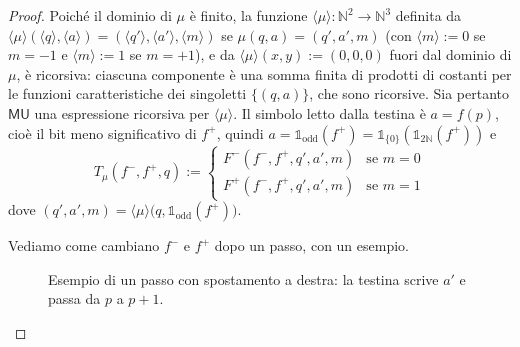 \begin{proof}
Poiché il dominio di $\mu$ è finito, la funzione $\langle\mu\rangle\colon\mathbb N^2\to\mathbb N^3$ definita da
$\langle\mu\rangle(\langle q\rangle,\langle a\rangle)=(\langle q'\rangle,\langle a'\rangle,\langle m\rangle)$ se $\mu(q,a)=(q',a',m)$ (con $\langle m\rangle:=0$ se $m=-1$ e $\langle m\rangle:=1$ se $m=+1$), e da $\langle\mu\rangle(x,y):=(0,0,0)$ fuori dal dominio di $\mu$, è ricorsiva: ciascuna componente è una somma finita di prodotti di costanti per le funzioni caratteristiche dei singoletti $\{(q,a)\}$, che sono ricorsive. Sia pertanto $\mathsf{MU}$ una espressione ricorsiva per $\langle\mu\rangle$.
Il simbolo letto dalla testina è $a=f(p)$, cioè il bit meno significativo di $f^+$, quindi $a=\mathbb 1_{\mathrm{odd}}(f^+)=\mathbb 1_{\{0\}}(\mathbb 1_{2\mathbb N}(f^+))$ e
\[
T_\mu(f^-,f^+,q):=
\begin{cases}
F^-(f^-,f^+,q',a',m) & \text{se } m=0\\
F^+(f^-,f^+,q',a',m) & \text{se } m=1
\end{cases}
\]
dove $(q',a',m)=\langle\mu\rangle\bigl(q,\mathbb 1_{\mathrm{odd}}(f^+)\bigr)$.

Vediamo come cambiano $f^-$ e $f^+$ dopo un passo, con un esempio.

\begin{figure}[H]
\centering
{}
\caption{Esempio di un passo con spostamento a destra: la testina scrive $a'$ e passa da $p$ a $p+1$.}
\label{fig:passo-destra}
\end{figure}


\end{proof}
